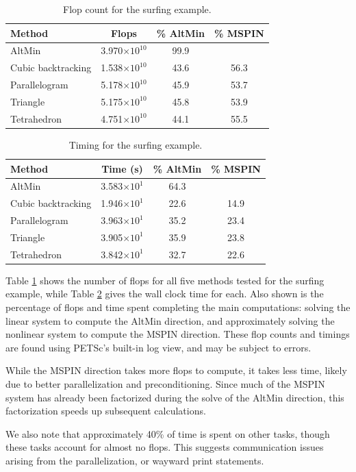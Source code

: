 \documentclass{article}
\numberwithin{equation}{section}
\begin{document}
\begin{table}
	\centering
	\begin{tabular}{l | c c c}
	Method & Flops & \% AltMin & \% MSPIN \\ \hline
	AltMin & 3.970$\times 10^{10}$ & 99.9 \\
	Cubic backtracking & 1.538$\times 10^{10}$ & 43.6 & 56.3 \\
	Parallelogram & 5.178$\times 10^{10}$ & 45.9 & 53.7 \\
	Triangle & 5.175$\times 10^{10}$ & 45.8 & 53.9 \\
	Tetrahedron & 4.751$\times 10^{10}$ & 44.1 & 55.5
	\end{tabular}
	\caption{Flop count for the surfing example.}
	\label{tab: surf flops}
\end{table}
\begin{table}
	\centering
	\begin{tabular}{l | c c c}
	Method & Time (s) & \% AltMin & \% MSPIN \\ \hline
	AltMin & 3.583$\times 10^{1}$ & 64.3  \\
	Cubic backtracking & 1.946$\times 10^{1}$ & 22.6 & 14.9 \\
	Parallelogram & 3.963$\times 10^{1}$ & 35.2 & 23.4 \\
	Triangle & 3.905$\times 10^{1}$ & 35.9 & 23.8 \\
	Tetrahedron & 3.842$\times 10^{1}$ & 32.7 & 22.6
	\end{tabular}
	\caption{Timing for the surfing example.}
	\label{tab: surf time}
\end{table}
Table \ref{tab: surf flops} shows the number of flops for all five methods tested for the surfing example, while Table \ref{tab: surf time} gives the wall clock time for each.
Also shown is the percentage of flops and time spent completing the main computations: solving the linear system to compute the AltMin direction, and approximately solving the nonlinear system to compute the MSPIN direction.
These flop counts and timings are found using PETSc's built-in log view, and may be subject to errors.

While the MSPIN direction takes more flops to compute, it takes less time, likely due to better parallelization and preconditioning.
Since much of the MSPIN system has already been factorized during the solve of the AltMin direction, this factorization speeds up subsequent calculations.

We also note that approximately 40\% of time is spent on other tasks, though these tasks account for almost no flops.
This suggests communication issues arising from the parallelization, or wayward print statements.
\end{document}

